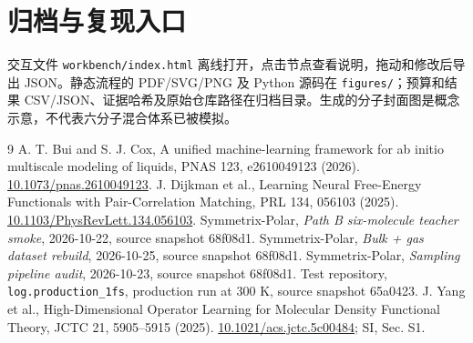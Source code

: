 \documentclass[11pt,a4paper]{article}
\begin{document}
\section{归档与复现入口}
交互文件 \texttt{workbench/index.html} 离线打开，点击节点查看说明，拖动和修改后导出 JSON。静态流程的 PDF/SVG/PNG 及 Python 源码在 \texttt{figures/}；预算和结果 CSV/JSON、证据哈希及原始仓库路径在归档目录。生成的分子封面图是概念示意，不代表六分子混合体系已被模拟。

\begin{thebibliography}{9}
 A. T. Bui and S. J. Cox, A unified machine-learning framework for ab initio multiscale modeling of liquids, PNAS 123, e2610049123 (2026). \href{https://doi.org/10.1073/pnas.2610049123}{10.1073/pnas.2610049123}.
 J. Dijkman et al., Learning Neural Free-Energy Functionals with Pair-Correlation Matching, PRL 134, 056103 (2025). \href{https://doi.org/10.1103/PhysRevLett.134.056103}{10.1103/PhysRevLett.134.056103}.
 Symmetrix-Polar, \textit{Path B six-molecule teacher smoke}, 2026-10-22, source snapshot 68f08d1.
 Symmetrix-Polar, \textit{Bulk + gas dataset rebuild}, 2026-10-25, source snapshot 68f08d1.
 Symmetrix-Polar, \textit{Sampling pipeline audit}, 2026-10-23, source snapshot 68f08d1.
 Test repository, \texttt{log.production\_1fs}, production run at 300 K, source snapshot 65a0423.
 J. Yang et al., High-Dimensional Operator Learning for Molecular Density Functional Theory, JCTC 21, 5905--5915 (2025). \href{https://doi.org/10.1021/acs.jctc.5c00484}{10.1021/acs.jctc.5c00484}; SI, Sec. S1.
\end{thebibliography}
\end{document}
